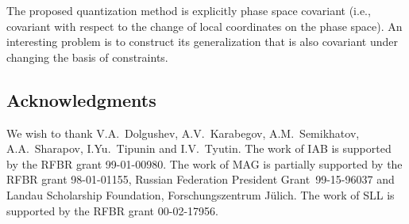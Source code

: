 \documentclass[a4paper,11pt]{amsart}
\numberwithin{thm}{section} %
\numberwithin{equation}{section} %
\numberwithin{figure}{section} %
\renewcommand{\:}{{\rm\, :\,}}
\begin{document}
The proposed quantization method is explicitly phase space covariant
(i.e., covariant with respect to the change of local coordinates on
the phase space).  An interesting problem is to construct its
generalization that is also covariant under changing the basis of
constraints.



\subsection*{Acknowledgments}
We wish to thank V.A.~Dolgushev, A.V.~Karabegov, A.M.~Semikhatov,
A.A.~Sha\-ra\-pov, I.Yu.~Tipunin and I.V.~Tyutin.  The work of IAB is
supported by the RFBR grant 99-01-00980. The work of MAG is partially
supported by the RFBR grant 98-01-01155, Russian Federation President
Grant~99-15-96037 and Landau Scholarship Foundation, Forschungszentrum
J\"ulich.  The work of SLL is supported by the RFBR grant 00-02-17956.
\end{document}
